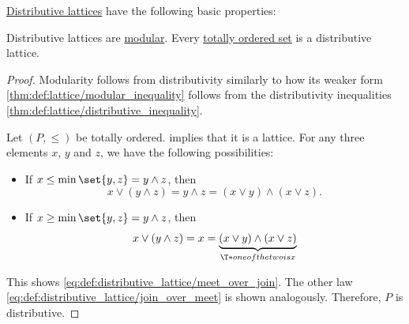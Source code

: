 \begin{proposition}\label{thm:def:distributive_lattice}
  \hyperref[def:distributive_lattice]{Distributive lattices} have the following basic properties:
  \begin{thmenum}
     Distributive lattices are \hyperref[def:modular_lattice]{modular}.
     Every \hyperref[def:totally_ordered_set]{totally ordered set} is a distributive lattice.
  \end{thmenum}
\end{proposition}
\begin{proof}
   Modularity follows from distributivity similarly to how its weaker form \cref{thm:def:lattice/modular_inequality} follows from the distributivity inequalities \cref{thm:def:lattice/distributive_inequality}.

   Let \( (P, \leq) \) be totally ordered.  implies that it is a lattice. For any three elements \( x \), \( y \) and \( z \), we have the following possibilities:
  \begin{itemize}
    \item If \( x \leq \min\set{ y, z } = y \wedge z \), then
    \begin{equation*}
      x \vee (y \wedge z) = y \wedge z = (x \vee y) \wedge (x \vee z).
    \end{equation*}

    \item If \( x \geq \min\set{ y, z } = y \wedge z \), then
    \begin{equation*}
      x \vee (y \wedge z) = x = \underbrace{(x \vee y) \wedge (x \vee z)}_{\T*{one of the two is} x}
    \end{equation*}
  \end{itemize}

  This shows \eqref{eq:def:distributive_lattice/meet_over_join}. The other law \eqref{eq:def:distributive_lattice/join_over_meet} is shown analogously. Therefore, \( P \) is distributive.
\end{proof}


